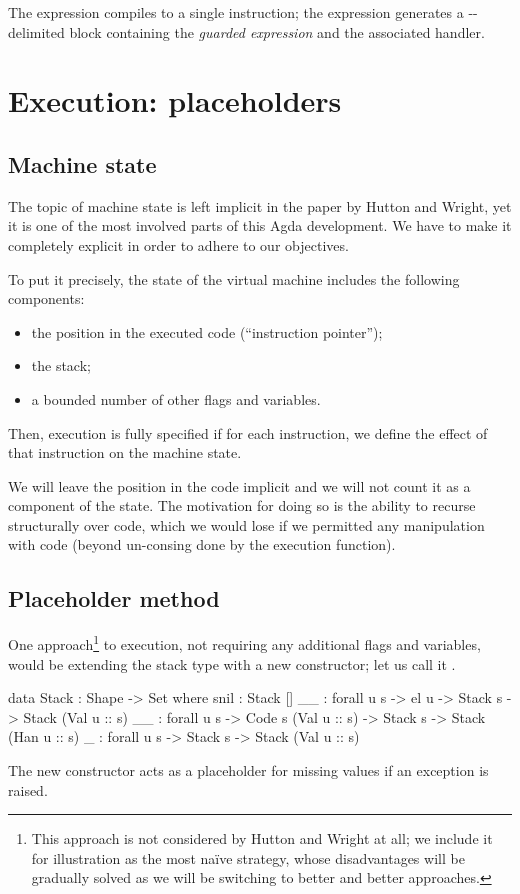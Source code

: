 The expression  compiles to a single  instruction;
the expression  generates a --delimited
block containing the \emph{guarded expression} and the associated handler.

\section{Execution: placeholders}

\subsection{Machine state}

The topic of machine state is left implicit in the paper by Hutton and Wright,
yet it is one of the most involved parts of this Agda development. We have to
make it completely explicit in order to adhere to our objectives.

To put it precisely, the state of the virtual machine includes
the following components:
\begin{itemize}
	\item the position in the executed code (``instruction pointer'');
	\item the stack;
	\item a bounded number of other flags and variables.
\end{itemize}

Then, execution is fully specified if for each instruction, we define the
effect of that instruction on the machine state.

We will leave the position in the code implicit and we will not count
it as a component of the state. The motivation for doing so is the ability to
recurse structurally over code, which we would lose if we permitted any
manipulation with code (beyond un-consing done by the execution function).

\subsection{Placeholder method}

One approach\footnote{This approach is not considered by Hutton and Wright at all;
we include it for illustration as the most na\"{i}ve strategy, whose disadvantages
will be gradually solved as we will be switching to better and better approaches.}
to execution, not requiring any additional flags and variables,
would be extending the stack type with a new constructor; let us call it
\ident{\void\scons\!\!\_}.
\begin{code}
  data Stack : Shape -> Set where
    snil : Stack []
    _\scons\_ : forall {u s} -> el u -> Stack s -> Stack (Val u :: s)
    _\sconsh\_ : forall {u s} -> Code s (Val u :: s) -> Stack s -> Stack (Han u :: s)
    \void\scons\_ : forall {u s} -> Stack s -> Stack (Val u :: s)
\end{code}
The new constructor acts as a placeholder for missing values if an exception is raised.

